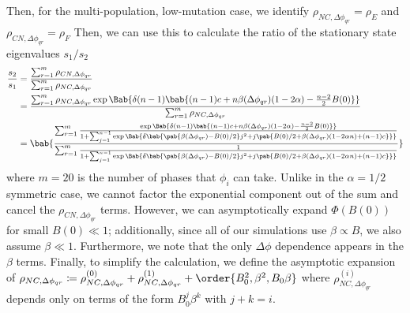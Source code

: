 Then, for the multi-population, low-mutation case, we identify
$\rho_{NC,\Delta \phi_{qr}} = \rho_E$ and $\rho_{CN,\Delta \phi_{qr}} = \rho_F$
Then, we can use this to calculate the ratio of the stationary state
eigenvalues $s_1/s_2$
\begin{align}
  \frac{s_2}{s_1} &= \frac
    {\sum_{r=1}^{m} \rho_{CN,\Delta \phi_{qr}}}
    {\sum_{r=1}^{m} \rho_{NC,\Delta \phi_{qr}} }
  \\
  &=
  \frac
  {\sum_{r=1}^{m} \rho_{NC,\Delta \phi_{qr}}
    \exp \Bab{
      \delta (n-1)
      \bab{
        (n-1) c + n \beta(\Delta \phi_{qr}) (1 - 2 \alpha)
        - \frac{n-2}{2} B(0)
      }
    }
  }
  {\sum_{r=1}^{m} \rho_{NC,\Delta \phi_{qr}}}
  \\
  &=
  \bab{
    \frac
    {\sum_{r=1}^{m} \frac
      {\exp \Bab{ \delta (n-1)
        \bab{
          (n-1) c + n \beta(\Delta \phi_{qr}) (1 - 2 \alpha) - \frac{n-2}{2} B(0)
        }}
      }
      {1 + \sum_{j=1}^{n-1} \exp\Bab{
        \delta \bab{
         \pab{\beta(\Delta \phi_{qr}) - B(0)/2} j^2
         + j \pab{B(0)/2 + \beta(\Delta \phi_{qr}) (1 - 2 \alpha n) + (n-1) c}
        }}
      }
    }
    {\sum_{r=1}^{m} \frac{1}
      {1 + \sum_{j=1}^{n-1} \exp\Bab{
        \delta \bab{
         \pab{\beta(\Delta \phi_{qr}) - B(0)/2} j^2
         + j \pab{B(0)/2 + \beta(\Delta \phi_{qr}) (1 - 2 \alpha n) + (n-1) c}
        }}
      }
    }
  }
  \label{eq:full_analytic_frac}
\end{align}
where $m = 20$ is the number of phases that $\phi_i$ can take.
Unlike in the $\alpha = 1/2$ symmetric case, we cannot factor the
exponential component out of the sum and cancel the $\rho_{CN,\Delta
\phi_{qr}}$ terms.
However, we can asymptotically expand $\Phi(B(0))$ for small $B(0) \ll 1$;
additionally, since all of our simulations use $\beta \propto B$,
we also assume $\beta \ll 1$.
Furthermore, we note that the only $\Delta \phi$ dependence
appears in the $\beta$ terms.
Finally, to simplify the calculation,
we define the asymptotic expansion of
$\rho_{NC,\Delta \phi_{qr}} \coloneqq
\rho_{NC,\Delta \phi_{qr}}^{(0)}
+
\rho_{NC,\Delta \phi_{qr}}^{(1)}
+
\order{B_0^2, \beta^2, B_0 \beta}
$
where
$
\rho_{NC,\Delta \phi_{qr}}^{(i)}
$
depends only on terms of the form $B_0^j \beta^k$
with $j+k=i$.

